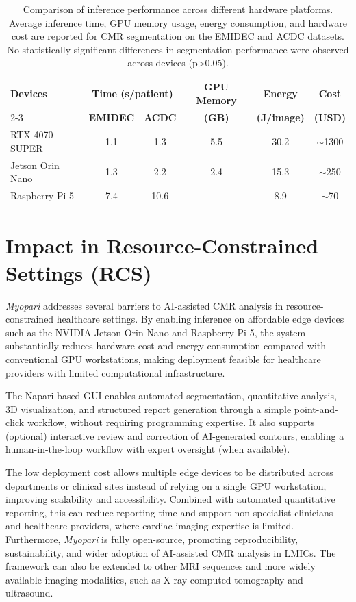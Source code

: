 \documentclass[runningheads]{llncs}
\begin{document}
\begin{table}[!ht]
\centering
\caption{Comparison of inference performance across different hardware platforms. Average inference time, GPU memory usage, energy consumption, and hardware cost are reported for CMR segmentation on the EMIDEC and ACDC datasets. No statistically significant differences in segmentation performance were observed across devices (p>0.05).}
\label{tab:hardware}
\begin{tabular}{lccccc}
\toprule
\multirow{2}{*}{\textbf{Devices}} &
\multicolumn{2}{c}{\textbf{Time (s/patient)}} &
\textbf{GPU Memory} &
\textbf{Energy} &
\textbf{Cost} \\
\cmidrule(lr){2-3}
& \textbf{EMIDEC} & \textbf{ACDC} & \textbf{(GB)} & \textbf{(J/image)} & \textbf{(USD)} \\
\midrule
RTX 4070 SUPER & 1.1 & 1.3 & 5.5 & 30.2 & $\sim$1300 \\
Jetson Orin Nano              & 1.3 & 2.2 & 2.4 & 15.3 & $\sim$250 \\
Raspberry Pi 5                & 7.4 & 10.6 & --  & 8.9  & $\sim$70 \\
\bottomrule
\end{tabular}
\end{table}


\section{Impact in Resource-Constrained Settings (RCS)}

\textit{Myopari} addresses several barriers to AI-assisted CMR analysis in resource-constrained healthcare settings. By enabling inference on affordable edge devices such as the NVIDIA Jetson Orin Nano and Raspberry Pi 5, the system substantially reduces hardware cost and energy consumption compared with conventional GPU workstations, making deployment feasible for healthcare providers with limited computational infrastructure.

The Napari-based GUI enables automated segmentation, quantitative analysis, 3D visualization, and structured report generation through a simple point-and-click workflow, without requiring programming expertise. It also supports (optional) interactive review and correction of AI-generated contours, enabling a human-in-the-loop workflow with expert oversight (when available).

The low deployment cost allows multiple edge devices to be distributed across departments or clinical sites instead of relying on a single GPU workstation, improving scalability and accessibility. Combined with automated quantitative reporting, this can reduce reporting time and support non-specialist clinicians and healthcare providers, where cardiac imaging expertise is limited. Furthermore, \textit{Myopari} is fully open-source, promoting reproducibility, sustainability, and wider adoption of AI-assisted CMR analysis in LMICs. The framework can also be extended to other MRI sequences and more widely available imaging modalities, such as X-ray computed tomography and ultrasound. 
\end{document}

